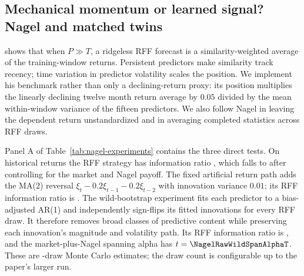 
\subsection{Mechanical momentum or learned signal? Nagel and matched twins}

\citet{nagel2025seemingly} shows that when $P\gg T$, a ridgeless RFF forecast
is a similarity-weighted average of the training-window returns. Persistent
predictors make similarity track recency; time variation in predictor
volatility scales the position. We implement his benchmark rather than only a
declining-return proxy: its position multiplies the linearly declining twelve
month return average by $0.05$ divided by the mean within-window variance of
the fifteen predictors. We also follow Nagel in leaving the dependent return
unstandardized and in averaging completed statistics across RFF draws.

Panel A of Table~\ref{tab:nagel-experiments} contains the three direct tests.
On historical returns the RFF strategy has information ratio
\NagelRawHistIR, which falls to \NagelRawHistSpanIR{} after controlling for the
market and Nagel payoff. The fixed artificial return path adds the MA(2)
reversal $\xi_t-0.2\xi_{t-1}-0.2\xi_{t-2}$ with innovation variance
$0.01$; its RFF information ratio is \NagelRawMAIR.
The wild-bootstrap experiment fits each predictor to a bias-adjusted AR(1)
and independently sign-flips its fitted innovations for every RFF draw. It
therefore removes broad classes of predictive content while preserving each
innovation's magnitude and volatility path. Its RFF information ratio is
\NagelRawWildIR, and the market-plus-Nagel spanning alpha has
$t=\NagelRawWildSpanAlphaT$. These are \NagelExperimentSeeds{}-draw Monte
Carlo estimates; the draw count is configurable up to the paper's larger run.

